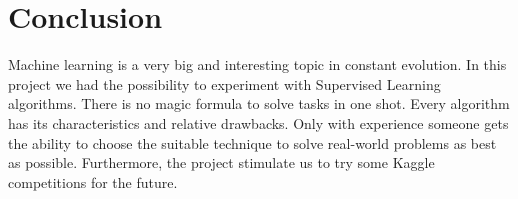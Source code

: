 \documentclass{article}
\begin{document}
\section{Conclusion}
Machine learning is a very big and interesting topic in constant evolution.
\break In this project we had the possibility to experiment with Supervised Learning algorithms.
There is no magic formula to solve tasks in one shot. Every algorithm has its characteristics and relative drawbacks. Only with experience someone gets the ability to choose the suitable technique to solve real-world problems as best as possible.
Furthermore, the project stimulate us to try some Kaggle competitions for the future.
\end{document}
